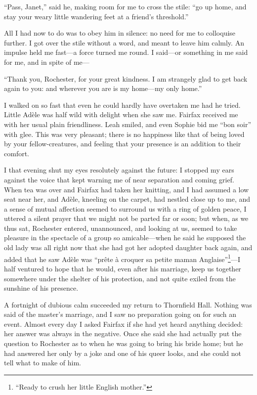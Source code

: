 \enquote{Pass, Janet,} said he, making room for me to cross the stile:
\enquote{go up home, and stay your weary little wandering feet at a
friend's threshold.}

All I had now to do was to obey him in silence: no need for me to
colloquise further. I got over the stile without a word, and meant to
leave him calmly. An impulse held me fast---a force turned me round. I
said---or something in me said for me, and in spite of me---

\enquote{Thank you, \Mr{} Rochester, for your great kindness. I am
strangely glad to get back again to you: and wherever you are is my
home---my only home.}

I walked on so fast that even he could hardly have overtaken me had he
tried. Little Adèle was half wild with delight when she saw me. \Mrs{}
Fairfax received me with her usual plain friendliness. Leah smiled, and
even Sophie bid me \enquote{bon soir} with glee. This was very
pleasant; there is no happiness like that of being loved by your
fellow-creatures, and feeling that your presence is an addition to their
comfort.

I that evening shut my eyes resolutely against the future: I stopped my
ears against the voice that kept warning me of near separation and
coming grief. When tea was over and \Mrs{} Fairfax had taken her
knitting, and I had assumed a low seat near her, and Adèle, kneeling on
the carpet, had nestled close up to me, and a sense of mutual affection
seemed to surround us with a ring of golden peace, I uttered a silent
prayer that we might not be parted far or soon; but when, as we thus
sat, \Mr{} Rochester entered, unannounced, and looking at us, seemed to
take pleasure in the spectacle of a group so amicable---when he said he
supposed the old lady was all right now that she had got her adopted
daughter back again, and added that he saw Adèle was \foreignquote{french}{prête à
croquer sa petite maman Anglaise}\footnote{\enquote{Ready to crush her little English mother.}}---I half ventured to hope that he
would, even after his marriage, keep us together somewhere under the
shelter of his protection, and not quite exiled from the sunshine of his
presence.

A fortnight of dubious calm succeeded my return to Thornfield Hall. 
Nothing was said of the master's marriage, and I saw no preparation
going on for such an event. Almost every day I asked \Mrs{} Fairfax if
she had yet heard anything decided: her answer was always in the
negative. Once she said she had actually put the question to \Mr{}
 Rochester as to when he was going to bring his bride home; but he had
answered her only by a joke and one of his queer looks, and she could
not tell what to make of him.

